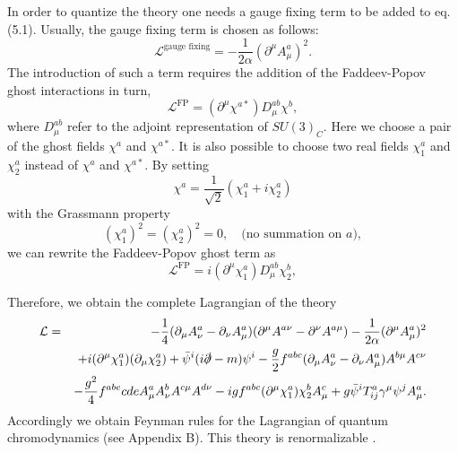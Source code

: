 In order to quantize the theory one needs a gauge fixing term to be added to eq. (5.1). Usually, the gauge fixing term is chosen as follows:
\begin{equation}
\mathcal{L}^\text{gauge fixing}=-\frac{1}{2\alpha}(\partial^\mu A_\mu^a)^2.
\end{equation}
The introduction of such a term requires the addition of the Faddeev-Popov ghost interactions in turn,
\begin{equation}
\mathcal{L}^\text{FP}=(\partial^\mu\chi^{a\ast})D^{ab}_\mu\chi^b,
\end{equation}
where $D^{ab}_\mu$ refer to the adjoint representation of $SU(3)_C$. Here we choose a pair of the ghost fields $\chi^a$ and $\chi^{a\ast}$. It is also possible to choose two real fields $\chi^a_1$ and $\chi^a_2$ instead of $\chi^a$ and $\chi^{a\ast}$. By setting
\begin{equation}
\chi^a=\frac{1}{\sqrt{2}}(\chi^a_1+i\chi^a_2)
\end{equation}
with the Grassmann property
\begin{equation}
(\chi^a_1)^2=(\chi^a_2)^2=0, \quad\text{(no summation on $a$)},
\end{equation}
we can rewrite the Faddeev-Popov ghost term as
\begin{equation}
\mathcal{L}^\text{FP}=i(\partial^\mu\chi_1^{a})D^{ab}_\mu\chi_2^b,
\end{equation}

Therefore, we obtain the complete Lagrangian of the theory
\begin{eqnarray}
\mathcal{L}&=&-\frac{1}{4}(\partial_\mu A^a_\nu-\partial_\nu A^a_\mu)(\partial^\mu A^{a\nu}-\partial^\nu A^{a\mu})-\frac{1}{2\alpha}(\partial^\mu A^a_\mu)^2\nonumber\\
&&+i(\partial^\mu\chi^{a}_1)(\partial_\mu\chi^a_2)+\bar{\psi}^i(i\slashed \partial-m)\psi^i-\frac{g}{2}f^{abc}(\partial_\mu A^a_\nu-\partial_\nu A^a_\mu)A^{b\mu}A^{c\nu}  \nonumber\\
&&-\frac{g^2}{4}f^{abe}{cde}A_\mu^aA_\nu^bA^{c\mu}A^{d\nu}-igf^{abc}(\partial^\mu\chi^{a}_1)\chi^b_2 A_\mu^c+g\bar{\psi}^iT_{ij}^a\gamma^\mu\psi^j A^a_\mu.\nonumber\\
\end{eqnarray}
Accordingly we obtain Feynman rules for the Lagrangian of quantum chromodynamics (see Appendix B). This theory is renormalizable \cite{AbersLee}. 

